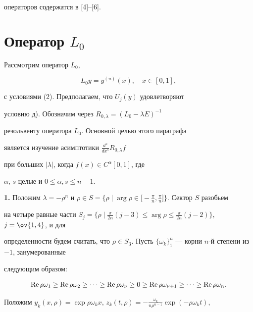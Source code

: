 операторов содержатся в [4]--[6].





\section{Оператор $L_0$}





Рассмотрим оператор $L_0$,


$$


L_0y=y^{(n)}(x),\quad x\in[0,1],


$$


с условиями (2). Предполагаем, что $U_j(y)$ удовлетворяют


условию д). Обозначим через $R_{0,\lambda}=(L_0-\lambda E)^{-1}$


резольвенту оператора $L_0$. Основной целью этого параграфа


является изучение асимптотики $\frac {d^s}{dx^s}R_{0,\lambda}f$


при больших $|\lambda|$, когда $f(x)\in C^\alpha[0,1]$, где


$\alpha$, $s$ целые и $0\le\alpha,s\le n-1$.


\medskip





{\bf 1.} Положим $\lambda=-\rho^n$ и $\rho\in S=\big\{\rho\mid\arg\rho\in


\big[-\frac {\pi}n, \frac {\pi}n\big]\big\}$. Сектор $S$ разобьем


на четыре равные части $S_j=\big\{\rho\mid \frac {\pi}{2n}(j-3)\le


\arg\rho\le \frac {\pi}{2n}(j-2)\big\}$, $j=\ov{1,4}$, и для


определенности будем считать, что $\rho\in S_3$. Пусть $\{\omega


_k\}_1^n$ --- корни $n$-й степени из $-1$, занумерованные


следующим образом:


$$


\re\rho\omega_1\ge \re\rho\omega_2\ge\dotsb\ge \re\rho


\omega_\nu\ge0\ge \re\rho\omega_{\nu+1}\ge\dotsb\ge \re\rho


\omega_n.


$$


Положим $y_k(x,\rho)=\exp\rho\omega_kx$, $ z_k(t,\rho)=


- \frac {\omega_k}{n\rho^{n-1}}\exp(-\rho\omega_kt)$,


